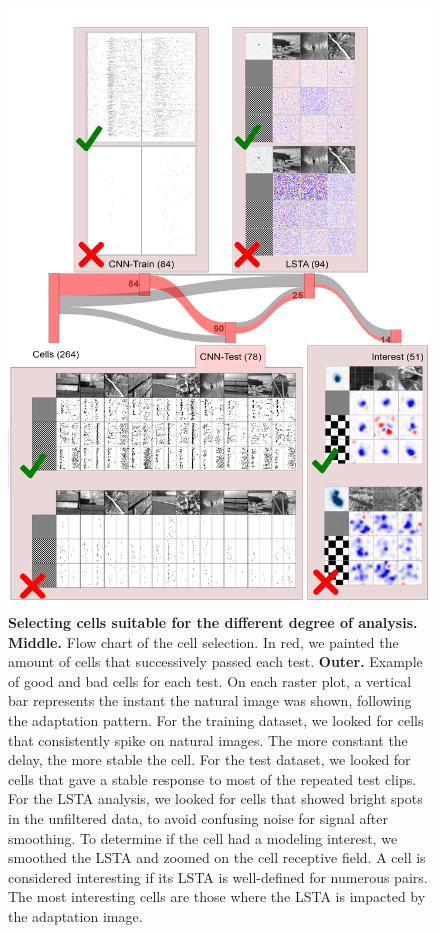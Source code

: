 \begin{figure}
    \centering
    \includegraphics[width=\textwidth]{pics/CellSelection.png}
    \caption{\textbf{Selecting cells suitable for the different degree of
            analysis.} \textbf{Middle.} Flow chart of the cell selection. In
        red, we painted the amount of cells that successively passed each test.
        \textbf{Outer.} Example of good and
        bad cells
        for each test. On each raster plot, a vertical bar represents the
        instant the natural image was shown, following the adaptation pattern.
        For the
        training dataset, we looked for cells that
        consistently spike on natural images. The more constant the delay, the
        more
        stable the cell. For the test dataset, we looked for cells that gave a
        stable
        response to most of the repeated test clips. For the LSTA analysis, we
        looked
        for cells that showed bright spots in the unfiltered data, to avoid
        confusing
        noise for signal after smoothing. To determine if the cell had a
        modeling
        interest, we smoothed the LSTA and zoomed on the cell receptive field.
        A cell
        is considered interesting if its LSTA is well-defined for numerous
        pairs. The
        most interesting cells are those where the LSTA is impacted by the
        adaptation
        image.}
    \label{fig:cell_selecion}
\end{figure}

